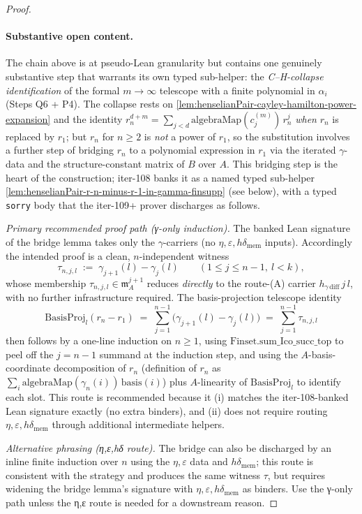 \begin{proof}
\paragraph{Substantive open content.}
The chain above is at pseudo-Lean granularity but contains one
genuinely substantive step that warrants its own typed sub-helper:
the \emph{C--H-collapse identification} of the formal
$m \to \infty$ telescope with a finite polynomial in $\alpha_i$
(Steps Q6 + P4). The collapse rests on
\cref{lem:henselianPair-cayley-hamilton-power-expansion} and the
identity $r_n^{d+m} = \sum_{j < d} \mathrm{algebraMap}(c^{(m)}_j)
\,r_n^j$ \emph{when} $r_n$ is replaced by $r_1$; but $r_n$ for
$n \ge 2$ is \emph{not} a power of $r_1$, so the substitution
involves a further step of bridging $r_n$ to a polynomial
expression in $r_1$ via the iterated $\gamma$-data and the
structure-constant matrix of $B$ over $A$. This bridging step is
the heart of the construction; iter-108 banks it as a named
typed sub-helper
\cref{lem:henselianPair-r-n-minus-r-1-in-gamma-finsupp} (see
below), with a typed \texttt{sorry} body that the iter-109+
prover discharges as follows.

\emph{Primary recommended proof path (γ-only induction).} The
banked Lean signature of the bridge lemma takes only the
$\gamma$-carriers (no $\eta, \varepsilon, h\delta_{\mathrm{mem}}$
inputs). Accordingly the intended proof is a clean,
$n$-independent witness
\[
\tau_{n,j,l} \;:=\; \gamma_{j+1}(l) - \gamma_j(l)
\qquad (1 \le j \le n - 1,\ l < k),
\]
whose membership $\tau_{n,j,l} \in \mathfrak m_A^{j + 1}$
reduces \emph{directly} to the route-(A) carrier
$h_{\gamma\,\mathrm{diff}}\,j\,l$, with no further infrastructure
required. The basis-projection telescope identity
\[
\mathrm{BasisProj}_l(r_n - r_1)
\;=\; \sum_{j = 1}^{n - 1}\bigl(\gamma_{j+1}(l) - \gamma_j(l)\bigr)
\;=\; \sum_{j = 1}^{n - 1}\tau_{n,j,l}
\]
then follows by a one-line induction on $n \ge 1$, using
$\mathrm{Finset.sum\_Ico\_succ\_top}$ to peel off the
$j = n - 1$ summand at the induction step, and using the
$A$-basis-coordinate decomposition of $r_n$ (definition of $r_n$
as $\sum_i \mathrm{algebraMap}(\gamma_n(i))\,\mathrm{basis}(i)$)
plus $A$-linearity of $\mathrm{BasisProj}_l$ to identify each
slot. This route is recommended because it (i) matches the
iter-108-banked Lean signature exactly (no extra binders), and
(ii) does not require routing $\eta, \varepsilon, h\delta_{\mathrm{mem}}$
through additional intermediate helpers.

\emph{Alternative phrasing (η,ε,hδ route).} The bridge can also
be discharged by an inline finite induction over $n$ using the
$\eta, \varepsilon$ data and $h\delta_{\mathrm{mem}}$; this
route is consistent with the strategy and produces the same
witness $\tau$, but requires widening the bridge lemma's
signature with $\eta, \varepsilon, h\delta_{\mathrm{mem}}$ as
binders. Use the γ-only path unless the η,ε route is needed
for a downstream reason.


\end{proof}
